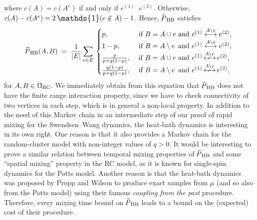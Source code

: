 \documentclass{dis}
\theoremstyle{citing}
\begin{document}
where $c(A)=c(A^e)$ if and only if $e^{(1)}{\mathop{\stackrel{{A\setminus e}}{\longleftrightarrow}}}e^{(2)}$. 
Otherwise, $c(A)-c(A^e)=2 \,{\scalebox{1.2}{\raisebox{-0.2mm}{$\mathds{1}$}}}(e\notin A)-1$.
Hence, ${{\raisebox{2pt}{ ${\widetilde{{}}}$ }\mkern-14mu P}_{\rm HB}}$ satisfies
\begin{equation} \label{eq:RC-HB}
{{\raisebox{2pt}{ ${\widetilde{{}}}$ }\mkern-14mu P}_{\rm HB}}(A,B) \;=\;  \frac1{{\left\vert {E} \right\vert}}\sum_{e\in E}\,\begin{cases}
p, & \text{ if } B=A\cup e \text{ and } 
				e^{(1)}\stackrel{A\setminus e}{\longleftrightarrow}e^{(2)},\\
1-p, & \text{ if } B=A\setminus e \,\text{ and } 
				e^{(1)}\stackrel{A\setminus e}{\longleftrightarrow}e^{(2)},\\
\frac{p}{p+q(1-p)}, & \text{ if } B=A\cup e \text{ and } 
				e^{(1)}{\mathop{\hspace{1.3pt}\stackrel{{A\setminus e}}{\longarrownot\longleftrightarrow}}\hspace{1.3pt}}e^{(2)},\\
\frac{q(1-p)}{p+q(1-p)}, & \text{ if } B=A\setminus e \,\text{ and } 
				e^{(1)}{\mathop{\hspace{1.3pt}\stackrel{{A\setminus e}}{\longarrownot\longleftrightarrow}}\hspace{1.3pt}}e^{(2)},
\end{cases}
\end{equation}
for $A,B\in{{\Omega}_{\rm RC}}$. 
We immediately obtain from this equation that ${{\raisebox{2pt}{ ${\widetilde{{}}}$ }\mkern-14mu P}_{\rm HB}}$ does not 
have the finite range interaction property, since we have to 
check connectivity of two vertices in each step, which is 
in general 
a non-local property. 
In addition to the need of this Markov chain in an 
intermediate step of our proof of rapid mixing for the Swendsen--Wang 
dynamics, the heat-bath dynamics is interesting in its own right. 
One reason is that it also provides a Markov chain for the 
random-cluster model with non-integer values of $q>0$. 
It would be interesting to prove a similar  
relation between temporal mixing properties of 
${{\raisebox{2pt}{ ${\widetilde{{}}}$ }\mkern-14mu P}_{\rm HB}}$ and some ``spatial mixing'' property in the RC model, 
as it is known for single-spin dynamics for the Potts model. 
Another reason is that the heat-bath dynamics was proposed by 
Propp and Wilson \cite{PW} to produce exact samples from $\mu$ 
(and so also from the Potts model) using their famous 
\emph{coupling from the past} procedure. 
Therefore, every mixing time bound on ${{\raisebox{2pt}{ ${\widetilde{{}}}$ }\mkern-14mu P}_{\rm HB}}$ leads to a bound 
on the (expected) cost of their procedure.
\end{document}
